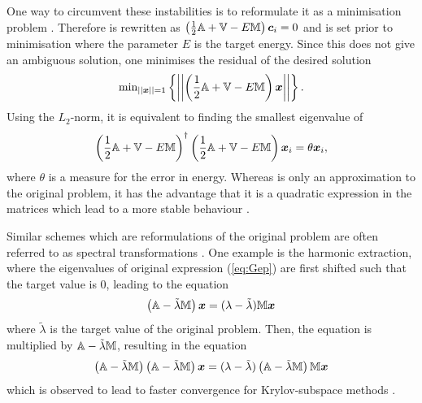 One way to circumvent these instabilities is to reformulate it as a minimisation problem \cite{H2pDeCleva}.
Therefore  is rewritten as $\left(\frac 12 \mathbb{A}+\mathbb{V} - E \mathbb{M}\right)\bm{c}_i = 0$ and is set prior to minimisation where the parameter $E$ is the target energy.
Since this does not give an ambiguous solution, one minimises the residual of the desired solution
\begin{equation}
\text{min}_{||\bm{x}||=1}\left\{\left|\left|\left(\frac 12 \mathbb{A}+\mathbb{V}-E\mathbb{M}\right)\bm{x} \right|\right| \right\}.
\end{equation}
Using the $L_2$-norm, it is equivalent to finding the smallest eigenvalue of
\begin{equation} \label{eq:SEmin}
\left(\frac 12 \mathbb{A}+\mathbb{V}-E\mathbb{M}\right)^\dagger
\left(\frac 12 \mathbb{A}+\mathbb{V}-E\mathbb{M}\right) \bm{x}_i = \theta \bm{x}_i,
\end{equation}
where $\theta$ is a measure for the error in energy.
%
Whereas  is only an approximation to the original problem, it has the advantage that it is a quadratic expression in the matrices which lead to a more stable behaviour \cite{H2pDeCleva}.

Similar schemes which are reformulations of the original problem are often referred to as spectral transformations \cite{slepcManual}.
One example is the harmonic extraction, where the eigenvalues of original expression (\ref{eq:Gep}) are first shifted such that the target value is $0$, leading to the equation 
\begin{equation} \label{eq:Shift}
\left(\mathbb{A}-\tilde{\lambda}\mathbb{M}\right)\bm{x}=(\lambda-\tilde{\lambda})\mathbb{M}\bm{x}
\end{equation}
where $\tilde{\lambda}$ is the target value of the original problem.
Then, the equation is multiplied by $\mathbb{A}-\tilde{\lambda}\mathbb{M}$, resulting in the equation 
\begin{equation}
\left(\mathbb{A}-\tilde{\lambda}\mathbb{M}\right)\left(\mathbb{A}-\tilde{\lambda}\mathbb{M}\right)\bm{x}=(\lambda-\tilde{\lambda})\left(\mathbb{A}-\tilde{\lambda}\mathbb{M}\right)\mathbb{M}\bm{x}
\end{equation}
which is observed to lead to faster convergence for Krylov-subspace methods \cite{slepcManual,harmExt}.

